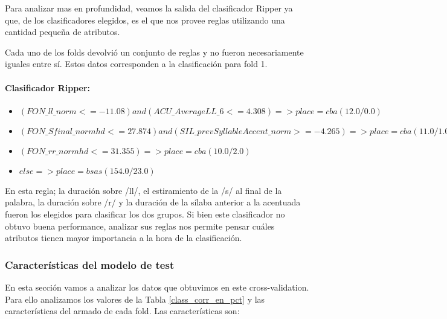 Para analizar mas en profundidad, veamos la salida del clasificador Ripper ya que, de los clasificadores elegidos, es el que nos provee reglas utilizando una cantidad pequeña de atributos.

Cada uno de los folds devolvió un conjunto de reglas y no fueron necesariamente iguales entre sí. Estos datos corresponden a la clasificación para fold 1.

\paragraph*{Clasificador Ripper:}

\begin{flushleft}
	\begin{itemize}
		
		\item $(FON\_ll\_norm <= -11.08) and (ACU\_AverageLL\_6 <= 4.308) => place=cba (12.0/0.0)$ \\
		\item $(FON\_Sfinal\_normhd <= 27.874) and (SIL\_prevSyllableAccent\_norm >= -4.265) => place=cba (11.0/1.0)$ \\
		\item $(FON\_rr\_normhd <= 31.355) => place=cba (10.0/2.0)$ \\
		\item $ else  => place=bsas (154.0/23.0)$
	\end{itemize}
\end{flushleft}

En esta regla; la duración sobre /ll/, el estiramiento de la /s/ al final de la palabra, la duración sobre /r/ y la duración de la sílaba anterior a la acentuada fueron los elegidos para clasificar los dos grupos. Si bien este clasificador no obtuvo buena performance, analizar sus reglas nos permite pensar cuáles atributos tienen mayor importancia a la hora de la clasificación.

\subsubsection{Características del modelo de test}

En esta sección vamos a analizar los datos que obtuvimos en este cross-validation. Para ello analizamos los valores de la Tabla \ref{class_corr_en_pct} y las características del armado de cada fold. Las características son:

